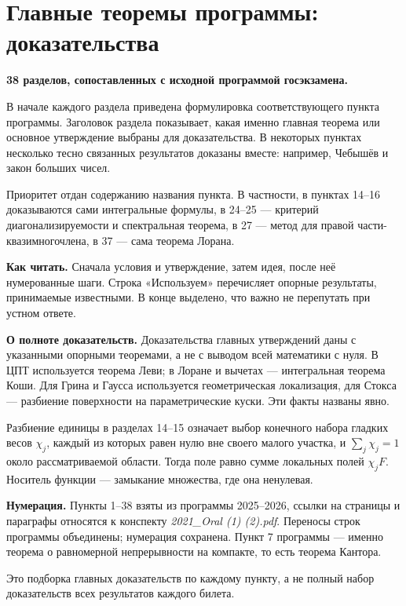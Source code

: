 \documentclass[11pt,a4paper]{article}
\begin{document}
\pagecolor{white}\color{black}
\section*{Главные теоремы программы: доказательства}
\textbf{38 разделов, сопоставленных с исходной программой госэкзамена.}

В начале каждого раздела приведена формулировка соответствующего пункта программы. Заголовок раздела показывает, какая именно главная теорема или основное утверждение выбраны для доказательства. В некоторых пунктах несколько тесно связанных результатов доказаны вместе: например, Чебышёв и закон больших чисел.

Приоритет отдан содержанию названия пункта. В частности, в пунктах 14--16 доказываются сами интегральные формулы, в 24--25 --- критерий диагонализируемости и спектральная теорема, в 27 --- метод для правой части-квазимногочлена, в 37 --- сама теорема Лорана.

\textbf{Как читать.} Сначала условия и утверждение, затем идея, после неё нумерованные шаги. Строка «Используем» перечисляет опорные результаты, принимаемые известными. В конце выделено, что важно не перепутать при устном ответе.

\textbf{О полноте доказательств.} Доказательства главных утверждений даны с указанными опорными теоремами, а не с выводом всей математики с нуля. В ЦПТ используется теорема Леви; в Лоране и вычетах --- интегральная теорема Коши. Для Грина и Гаусса используется геометрическая локализация, для Стокса --- разбиение поверхности на параметрические куски. Эти факты названы явно.

Разбиение единицы в разделах 14--15 означает выбор конечного набора гладких весов $\chi_j$, каждый из которых равен нулю вне своего малого участка, и $\sum_j\chi_j=1$ около рассматриваемой области. Тогда поле равно сумме локальных полей $\chi_jF$. Носитель функции --- замыкание множества, где она ненулевая.

\textbf{Нумерация.} Пункты 1--38 взяты из программы 2025--2026, ссылки на страницы и параграфы относятся к конспекту \textit{2021\_Oral (1) (2).pdf}. Переносы строк программы объединены; нумерация сохранена. Пункт 7 программы --- именно теорема о равномерной непрерывности на компакте, то есть теорема Кантора.

Это подборка главных доказательств по каждому пункту, а не полный набор доказательств всех результатов каждого билета.
\clearpage
{\small\tableofcontents}
\end{document}

